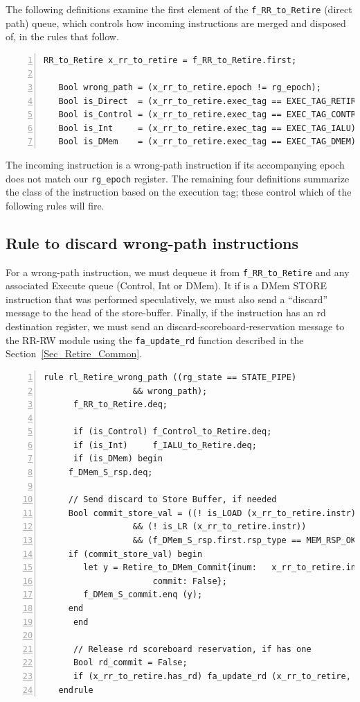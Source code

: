 The following definitions examine the first element of the
\verb|f_RR_to_Retire| (direct path) queue, which controls how incoming
instructions are merged and disposed of, in the rules that follow.

{\small
\begin{Verbatim}[frame=single, numbers=left, label=(In file:src\_Fife/S5\_Retire.bsv)]
   RR_to_Retire x_rr_to_retire = f_RR_to_Retire.first;

   Bool wrong_path = (x_rr_to_retire.epoch != rg_epoch);
   Bool is_Direct  = (x_rr_to_retire.exec_tag == EXEC_TAG_RETIRE);
   Bool is_Control = (x_rr_to_retire.exec_tag == EXEC_TAG_CONTROL);
   Bool is_Int     = (x_rr_to_retire.exec_tag == EXEC_TAG_IALU);
   Bool is_DMem    = (x_rr_to_retire.exec_tag == EXEC_TAG_DMEM);
\end{Verbatim}
}

The incoming instruction is a wrong-path instruction if its
accompanying epoch does not match our \verb|rg_epoch| register.  The
remaining four definitions summarize the class of the instruction
based on the execution tag; these control which of the following rules
will fire.


\subsection{Rule to discard wrong-path instructions}

For a wrong-path instruction, we must dequeue it from
\verb|f_RR_to_Retire| and any associated Execute queue (Control, Int
or DMem).  It if is a DMem STORE instruction that was performed
speculatively, we must also send a ``discard'' message to the head of
the store-buffer.  Finally, if the instruction has an rd destination
register, we must send an discard-scoreboard-reservation message to
the RR-RW module using the \verb|fa_update_rd| function described in
the Section~\ref{Sec_Retire_Common}.

{\small
\begin{Verbatim}[frame=single, numbers=left, label=(In file:src\_Fife/S5\_Retire.bsv)]
   rule rl_Retire_wrong_path ((rg_state == STATE_PIPE)
			      && wrong_path);
      f_RR_to_Retire.deq;

      if (is_Control) f_Control_to_Retire.deq;
      if (is_Int)     f_IALU_to_Retire.deq;
      if (is_DMem) begin
	 f_DMem_S_rsp.deq;

	 // Send discard to Store Buffer, if needed
	 Bool commit_store_val = ((! is_LOAD (x_rr_to_retire.instr))
				  && (! is_LR (x_rr_to_retire.instr))
				  && (f_DMem_S_rsp.first.rsp_type == MEM_RSP_OK));
	 if (commit_store_val) begin
	    let y = Retire_to_DMem_Commit{inum:   x_rr_to_retire.inum,
					  commit: False};
	    f_DMem_S_commit.enq (y);
	 end
      end

      // Release rd scoreboard reservation, if has one
      Bool rd_commit = False;
      if (x_rr_to_retire.has_rd) fa_update_rd (x_rr_to_retire, rd_commit, ?);
   endrule
\end{Verbatim}
}

